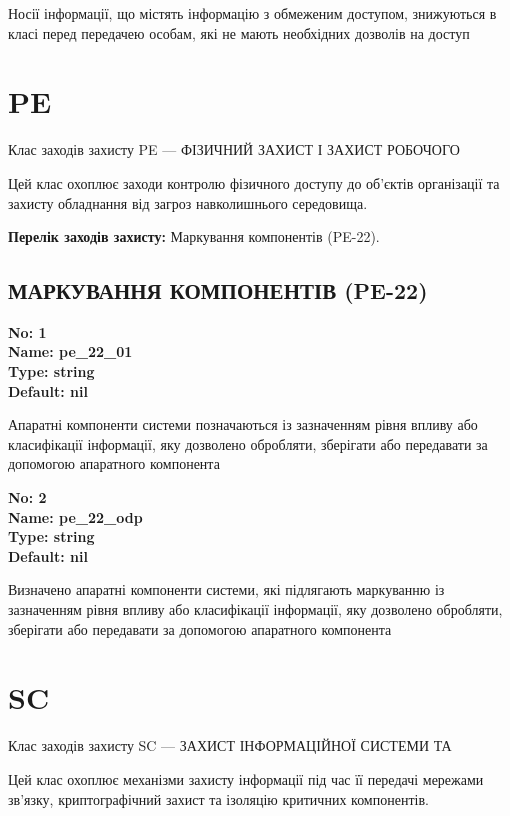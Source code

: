 \documentclass{article}
\begin{document}
{\footnotesize Носії інформації, що містять інформацію з обмеженим доступом, знижуються в класі перед передачею особам, які не мають необхідних дозволів на доступ}




\section{PE}
Клас заходів захисту PE --- ФІЗИЧНИЙ ЗАХИСТ І ЗАХИСТ РОБОЧОГО

Цей клас охоплює заходи контролю фізичного доступу до об'єктів організації та захисту обладнання від загроз навколишнього середовища.

\textbf{Перелік заходів захисту:} Маркування компонентів (PE-22).

\subsection{МАРКУВАННЯ КОМПОНЕНТІВ (PE-22)}


\vspace{10pt}
{\footnotesize\bfseries
No: 1\\
Name: pe\_\allowbreak{}22\_\allowbreak{}01\\
Type: string\\
Default: nil
}

{\footnotesize Апаратні компоненти системи позначаються із зазначенням рівня впливу або класифікації інформації, яку дозволено обробляти, зберігати або передавати за допомогою апаратного компонента}


{\footnotesize\bfseries
No: 2\\
Name: pe\_\allowbreak{}22\_\allowbreak{}odp\\
Type: string\\
Default: nil
}

{\footnotesize Визначено апаратні компоненти системи, які підлягають маркуванню із зазначенням рівня впливу або класифікації інформації, яку дозволено обробляти, зберігати або передавати за допомогою апаратного компонента}




\section{SC}
Клас заходів захисту SC --- ЗАХИСТ ІНФОРМАЦІЙНОЇ СИСТЕМИ ТА

Цей клас охоплює механізми захисту інформації під час її передачі мережами зв'язку, криптографічний захист та ізоляцію критичних компонентів.
\end{document}
